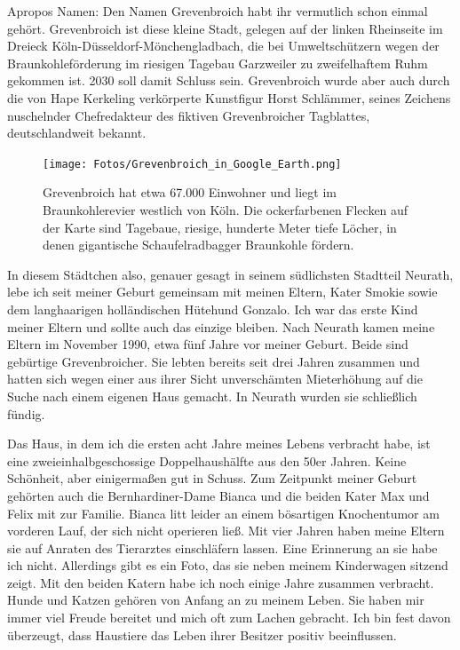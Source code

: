 \documentclass[fontsize=14pt,a4paper,headinclude,DIV=calc,automark]{scrbook}
\begin{document}
Apropos Namen: Den Namen Grevenbroich habt ihr vermutlich schon einmal gehört. Grevenbroich ist diese kleine Stadt, gelegen auf der linken Rheinseite im Dreieck Köln-Düsseldorf-Mönchengladbach, die bei Umweltschützern wegen der Braunkohleförderung im riesigen Tagebau Garzweiler zu zweifelhaftem Ruhm gekommen ist. 2030 soll damit Schluss sein. Grevenbroich wurde aber auch durch die von Hape Kerkeling verkörperte Kunstfigur Horst Schlämmer, seines Zeichens nuschelnder Chefredakteur des fiktiven Grevenbroicher Tagblattes, deutschlandweit bekannt.

\begin{figure}[ht]
    \centering
    \texttt{[image: Fotos/Grevenbroich\_in\_Google\_Earth.png]}
    \caption{Grevenbroich hat etwa 67.000 Einwohner und liegt im Braunkohlerevier westlich von Köln. Die ockerfarbenen Flecken auf der Karte sind Tagebaue, riesige, hunderte Meter tiefe Löcher, in denen gigantische Schaufelradbagger Braunkohle fördern.}
    \label{fig:grevenbroich}
\end{figure}

In diesem Städtchen also, genauer gesagt in seinem südlichsten Stadtteil Neurath, lebe ich seit meiner Geburt gemeinsam mit meinen Eltern, Kater Smokie sowie dem langhaarigen holländischen Hütehund Gonzalo. Ich war das erste Kind meiner Eltern und sollte auch das einzige bleiben. Nach Neurath kamen meine Eltern im November 1990, etwa fünf Jahre vor meiner Geburt. Beide sind gebürtige Grevenbroicher. Sie lebten bereits seit drei Jahren zusammen und hatten sich wegen einer aus ihrer Sicht unverschämten Mieterhöhung auf die Suche nach einem eigenen Haus gemacht. In Neurath wurden sie schließlich fündig.

Das Haus, in dem ich die ersten acht Jahre meines Lebens verbracht habe, ist eine zweieinhalbgeschossige Doppelhaushälfte aus den 50er Jahren. Keine Schönheit, aber einigermaßen gut in Schuss. Zum Zeitpunkt meiner Geburt gehörten auch die Bernhardiner-Dame Bianca und die beiden Kater Max und Felix mit zur Familie. Bianca litt leider an einem bösartigen Knochentumor am vorderen Lauf, der sich nicht operieren ließ. Mit vier Jahren haben meine Eltern sie auf Anraten des Tierarztes einschläfern lassen. Eine Erinnerung an sie habe ich nicht. Allerdings gibt es ein Foto, das sie neben meinem Kinderwagen sitzend zeigt. Mit den beiden Katern habe ich noch einige Jahre zusammen verbracht. Hunde und Katzen gehören von Anfang an zu meinem Leben. Sie haben mir immer viel Freude bereitet und mich oft zum Lachen gebracht. Ich bin fest davon überzeugt, dass Haustiere das Leben ihrer Besitzer positiv beeinflussen.
\end{document}
